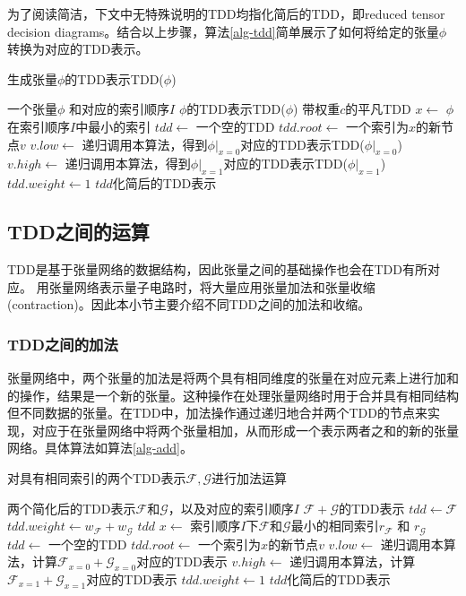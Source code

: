 为了阅读简洁，下文中无特殊说明的TDD均指化简后的TDD，即reduced tensor decision diagrams。结合以上步骤，算法\ref{alg-tdd}简单展示了如何将给定的张量\(\phi\)转换为对应的TDD表示。
\begin{algorithm}
    \caption{生成张量\(\phi\)的TDD表示TDD(\(\phi\))}
    \label{alg-tdd}
    \begin{algorithmic}[1]
    \Require 一个张量\(\phi\) 和对应的索引顺序\(I\)
    \Ensure \(\phi\)的TDD表示TDD(\(\phi\))
        \State \Return 带权重$c$的平凡TDD
    \EndIf
    \State \(x \gets\) \(\phi\)在索引顺序\(I\)中最小的索引
    \State \(tdd \gets\) 一个空的TDD
    \State \(tdd.root \gets\) 一个索引为\(x\)的新节点\(v\) 
    \State \(v.low \gets\) 递归调用本算法，得到\(\phi|_{x=0}\)对应的TDD表示TDD(\(\phi|_{x=0}\))
    \State \(v.high \gets\) 递归调用本算法，得到\(\phi|_{x=1}\)对应的TDD表示TDD(\(\phi|_{x=1}\))
    \State \(tdd.weight \gets 1\)
    \State \Return \(tdd\)化简后的TDD表示
    \end{algorithmic}
\end{algorithm}


\subsection{TDD之间的运算}
TDD是基于张量网络的数据结构，因此张量之间的基础操作也会在TDD有所对应。
用张量网络表示量子电路时，将大量应用张量加法和张量收缩(contraction)。因此本小节主要介绍不同TDD之间的加法和收缩。
\subsubsection*{TDD之间的加法}
张量网络中，两个张量的加法是将两个具有相同维度的张量在对应元素上进行加和的操作，结果是一个新的张量。这种操作在处理张量网络时用于合并具有相同结构但不同数据的张量。在TDD中，加法操作通过递归地合并两个TDD的节点来实现，对应于在张量网络中将两个张量相加，从而形成一个表示两者之和的新的张量网络。具体算法如算法\ref{alg-add}。
\begin{algorithm}
\caption{对具有相同索引的两个TDD表示\(\mathcal{F}, \mathcal{G}\)进行加法运算}
\label{alg-add}
\begin{algorithmic}[1]
\Require 两个简化后的TDD表示\(\mathcal{F}\)和\(\mathcal{G}\)，以及对应的索引顺序\(I\)
\Ensure \(\mathcal{F} + \mathcal{G}\)的TDD表示
    \State \(tdd \gets \mathcal{F}\)
    \State \(tdd.weight \gets w_{\mathcal{F}} + w_{\mathcal{G}}\)
    \State \Return \(tdd\)
\EndIf
\State \(x \gets\) 索引顺序\(I\)下\(\mathcal{F}\)和\(\mathcal{G}\)最小的相同索引\(r_{\mathcal{F}}\) 和 \(r_{\mathcal{G}}\)
\State \(tdd \gets\) 一个空的TDD
\State \(tdd.root \gets\) 一个索引为\(x\)的新节点\(v\)
\State \(v.low \gets\) 递归调用本算法，计算\(\mathcal{F}_{x=0} + \mathcal{G}_{x=0}\)对应的TDD表示
\State \(v.high \gets\) 递归调用本算法，计算\(\mathcal{F}_{x=1} + \mathcal{G}_{x=1}\)对应的TDD表示
\State \(tdd.weight \gets 1\)
\State \Return \(tdd\)化简后的TDD表示
\end{algorithmic}
\end{algorithm}

